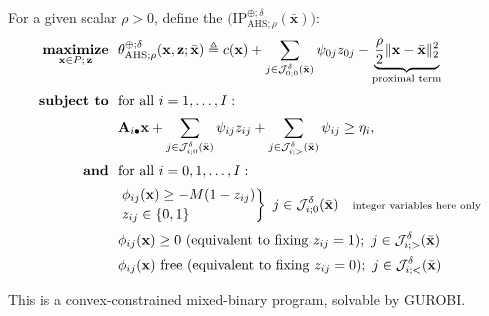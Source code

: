 \documentclass[aspectratio=169,xcolor=dvipsnames]{beamer}
\begin{document}
\begin{frame}
  \footnotesize
  \setlength{\abovedisplayskip}{3pt}
  \setlength{\belowdisplayskip}{3pt}

  For a given scalar $\rho>0$, define the
  $\bigl(\mathrm{IP}^{\oplus;\delta}_{\mathrm{AHS};\rho}(\bar{\mathbf{x}})
  \bigr)$:
  \[
    \begin{aligned}
      \operatorname*{\textbf{maximize}}_{\mathbf{x}\in P;\,\mathbf{z}}\ \
      &\theta^{\oplus;\delta}_{\mathrm{AHS};\rho}
        (\mathbf{x},\mathbf{z};\bar{\mathbf{x}})\triangleq c(\mathbf{x})
        +\sum_{j\in\mathcal{J}^\delta_{0;0}(\bar{\mathbf{x}})}\psi_{0j}z_{0j}
        -\underbrace{\frac{\rho}{2}\|\mathbf{x}-\bar{\mathbf{x}}\|_2^2}_{
          \text{proximal term}}\\[2pt]
      \operatorname*{\textbf{subject to}}\ \ &\text{for all }i=1,\ldots,I:\\[1pt]
      &\mathbf{A}_{i\bullet}\mathbf{x}
        +\sum_{j\in\mathcal{J}^\delta_{i;0}(\bar{\mathbf{x}})}\psi_{ij}z_{ij}
        +\sum_{j\in\mathcal{J}^\delta_{i;>}(\bar{\mathbf{x}})}\psi_{ij}
        \geq\eta_i,\\[1pt]
      \textbf{and}\ \ &\text{for all }i=0,1,\ldots,I:\\[1pt]
      &\left.\begin{array}{@{}l@{}}
          \phi_{ij}(\mathbf{x})\geq -M(1-z_{ij})\\[2pt]
          z_{ij}\in\{0,1\}
        \end{array}\right\}\ j\in\mathcal{J}^\delta_{i;0}(\bar{\mathbf{x}})
        \quad\text{\scriptsize integer variables here only}\\[2pt]
      &\phi_{ij}(\mathbf{x})\geq 0\ \text{(equivalent to fixing }z_{ij}=1);
        \ j\in\mathcal{J}^\delta_{i;>}(\bar{\mathbf{x}})\\[1pt]
      &\phi_{ij}(\mathbf{x})\text{ free (equivalent to fixing }z_{ij}=0);
        \ j\in\mathcal{J}^\delta_{i;<}(\bar{\mathbf{x}})
    \end{aligned}
  \]

  \vspace{0.04cm}
  This is a \textcolor{MediumRed}{convex-constrained mixed-binary program},
  solvable by GUROBI.
\end{frame}
\end{document}

